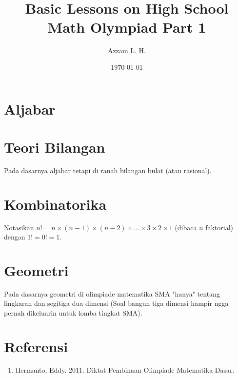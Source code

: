 \title{Basic Lessons on High School Math Olympiad Part 1}
\date{\today}
\author{Azzam L. H.}
\maketitle
\renewcommand*\contentsname{Daftar Isi}
\tableofcontents

\newpage
\section{Aljabar}





\newpage
\section{Teori Bilangan}
Pada dasarnya aljabar tetapi di ranah bilangan bulat (atau rasional).








        
\newpage    
\section{Kombinatorika}
Notasikan $n!=n \times (n-1) \times (n-2) \times \dots \times 3 \times 2 \times 1$ (dibaca $n$ faktorial) dengan $1!=0!=1$.









\newpage
\section{Geometri}
Pada dasarnya geometri di olimpiade matematika SMA "hanya" tentang lingkaran dan segitiga dua dimensi (Soal bangun tiga dimensi hampir ngga pernah dikeluarin untuk lomba tingkat SMA).






\section{Referensi}
\begin{enumerate}
\item Hermanto, Eddy. 2011. Diktat Pembinaan Olimpiade Matematika Dasar.
\end{enumerate}
